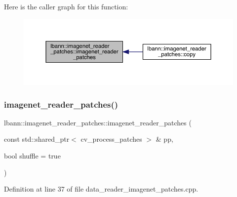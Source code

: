 Here is the caller graph for this function\+:\nopagebreak
\begin{figure}[H]
\begin{center}
\leavevmode
\includegraphics[width=350pt]{classlbann_1_1imagenet__reader__patches_ab63e39d6e17dfb76b3ccb7df940c862e_icgraph}
\end{center}
\end{figure}
\mbox{\label{classlbann_1_1imagenet__reader__patches_a03a784a9beaf615e9bae9b54763e951b}} 
\subsubsection{\texorpdfstring{imagenet\+\_\+reader\+\_\+patches()}{imagenet\_reader\_patches()}\hspace{0.1cm}{\footnotesize\ttfamily [2/3]}}
{\footnotesize\ttfamily lbann\+::imagenet\+\_\+reader\+\_\+patches\+::imagenet\+\_\+reader\+\_\+patches (\begin{DoxyParamCaption}\item[{const std\+::shared\+\_\+ptr$<$ cv\+\_\+process\+\_\+patches $>$ \&}]{pp,  }\item[{bool}]{shuffle = {\ttfamily true} }\end{DoxyParamCaption})}



Definition at line 37 of file data\+\_\+reader\+\_\+imagenet\+\_\+patches.\+cpp.


